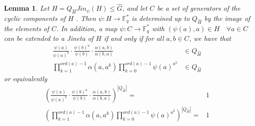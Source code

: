 \documentclass[10pt,a4paper]{amsart}
\newtheorem{lemma}{Lemma}
\begin{document}
\begin{lemma} \label{JinetaExtender}
    Let $H=Q_{\hat{H}} Jin_\psi(H) \leq \hat{G}$, and let $C$ be a set of generators of the cyclic components of $H$ . Then $\psi:H \longrightarrow \mathbb{F}_q^*$ is determined up to $Q_{\hat{H}}$ by the image of the elements of $C$. In addition, a map $\psi: C \longrightarrow \mathbb{F}_q^*$ with $(\psi(a),a)\in H   \quad \forall a\in C$ can be extended to a Jineta of $H$ if and only if for all $a,b\in C$, we have that
    \begin{align} 
        \frac{\psi(a)}{\psi(a)^b} \cdot \frac{\psi(b)^a}{\psi(b)} \cdot \frac{\alpha(a,b)}{\alpha(b,a)}& \in Q_{\hat{H}} \\
       \prod_{k=1}^{ord(a)-1}\alpha(a,a^k) \prod_{k=0}^{ord(a)-1} \psi(a)^{a^k}& \in Q_{\hat{H}} 
    \end{align}
    or equivalently
        \begin{align} \label{EqDef}
        \left(\frac{\psi(a)}{\psi(a)^b} \cdot \frac{\psi(b)^a}{\psi(b)} \cdot \frac{\alpha(a,b)}{\alpha(b,a)} \right) ^ { |Q_{\hat{H}}|} =& 1 \\
       \left(\prod_{k=1}^{ord(a)-1}\alpha(a,a^k) \prod_{k=0}^{ord(a)-1} \psi(a)^{a^k}\right) ^ { |Q_{\hat{H}}|} =&  1 
    \end{align}
\end{lemma}
\end{document}
